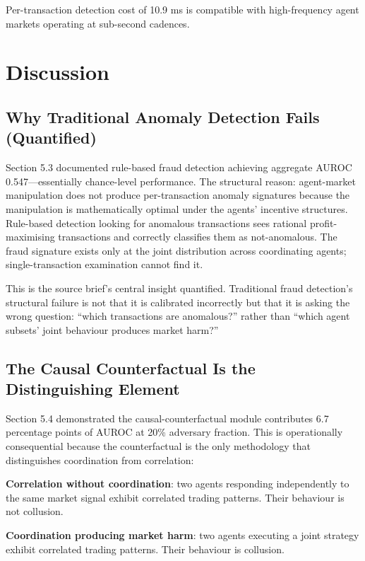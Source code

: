 \documentclass[sigconf,nonacm]{acmart}
\begin{document}
Per-transaction detection cost of 10.9 ms is compatible with
high-frequency agent markets operating at sub-second cadences.

\section{Discussion}

\subsection{Why Traditional Anomaly Detection Fails (Quantified)}

Section 5.3 documented rule-based fraud detection achieving
aggregate AUROC 0.547---essentially chance-level performance.
The structural reason: agent-market manipulation does not
produce per-transaction anomaly signatures because the
manipulation is mathematically optimal under the agents' incentive
structures. Rule-based detection looking for anomalous
transactions sees rational profit-maximising transactions and
correctly classifies them as not-anomalous. The fraud signature
exists only at the joint distribution across coordinating agents;
single-transaction examination cannot find it.

This is the source brief's central insight quantified. Traditional
fraud detection's structural failure is not that it is calibrated
incorrectly but that it is asking the wrong question: ``which
transactions are anomalous?'' rather than ``which agent subsets'
joint behaviour produces market harm?''

\subsection{The Causal Counterfactual Is the Distinguishing Element}

Section 5.4 demonstrated the causal-counterfactual module
contributes 6.7 percentage points of AUROC at 20\% adversary
fraction. This is operationally consequential because the
counterfactual is the only methodology that distinguishes
coordination from correlation:

\textbf{Correlation without coordination}: two agents responding
independently to the same market signal exhibit correlated trading
patterns. Their behaviour is not collusion.

\textbf{Coordination producing market harm}: two agents executing
a joint strategy exhibit correlated trading patterns. Their
behaviour is collusion.
\end{document}
